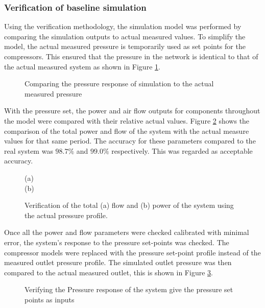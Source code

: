 	\subsubsection{Verification of baseline simulation}
	Using the verification methodology, the simulation model was performed by comparing the simulation outputs to actual measured values. To simplify the model, the actual measured pressure is temporarily used as set points for the compressors. This ensured that the pressure in the network is identical to that of the actual measured system as shown in Figure \ref{fig: Verification Pressure kusasalethu}.
	
	\par 
	
	\begin{figure}[h]
		\centering
		
		\caption{Comparing the pressure response of simulation to the actual measured pressure}
		\label{fig: Verification Pressure kusasalethu}
	\end{figure}

 	With the pressure set, the power and air flow outputs for components throughout the model were compared with their relative actual values. Figure \ref{fig: Verification Power kusasalethu} shows the comparison of the total power and flow of the system with the actual measure values for that same period. The accuracy for these parameters compared to the real system was $98.7 \%$ and $99.0 \%$ respectively. This was regarded as acceptable accuracy. 
 
	\begin{figure}[h]
		\centering
		
		(a)\\
		
		(b)\\
		\caption{Verification of the total (a) flow and (b) power of the system using the actual pressure profile.}
		\label{fig: Verification Power kusasalethu}
	\end{figure}

	Once all the power and flow parameters were checked calibrated with minimal error, the system's response to the pressure set-points was checked. The compressor models were replaced with the pressure set-point profile instead of the measured outlet pressure profile. The simulated outlet pressure was then compared to the actual measured outlet, this is shown in Figure \ref{fig: Verification Pressure kusasalethu Setpoint}.

	\begin{figure}[h]
		\centering
		
		\caption{Verifying the Pressure response of the system give the pressure set points as inputs}
		\label{fig: Verification Pressure kusasalethu Setpoint}
	\end{figure}
